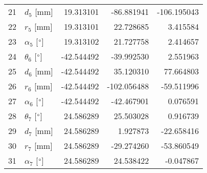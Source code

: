 \documentclass{standalone}%
\begin{document}
\begin{tabular}{llrrr}
21 &              $d_{5}$ [mm] &  19.313101 &  -86.881941 & -106.195043 \\
22 &              $r_{5}$ [mm] &  19.313101 &   22.728685 &    3.415584 \\
23 &  $\alpha_{5}$ [$\degree$] &  19.313102 &   21.727758 &    2.414657 \\
24 &  $\theta_{6}$ [$\degree$] & -42.544492 &  -39.992530 &    2.551963 \\
25 &              $d_{6}$ [mm] & -42.544492 &   35.120310 &   77.664803 \\
26 &              $r_{6}$ [mm] & -42.544492 & -102.056488 &  -59.511996 \\
27 &  $\alpha_{6}$ [$\degree$] & -42.544492 &  -42.467901 &    0.076591 \\
28 &  $\theta_{7}$ [$\degree$] &  24.586289 &   25.503028 &    0.916739 \\
29 &              $d_{7}$ [mm] &  24.586289 &    1.927873 &  -22.658416 \\
30 &              $r_{7}$ [mm] &  24.586289 &  -29.274260 &  -53.860549 \\
31 &  $\alpha_{7}$ [$\degree$] &  24.586289 &   24.538422 &   -0.047867 \\
\bottomrule
\end{tabular}
%
\end{document}
